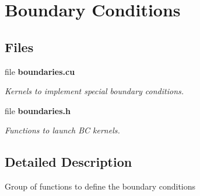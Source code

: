 \section{Boundary Conditions}
\label{group__boundaries}
\subsection*{Files}
\begin{DoxyCompactItemize}
\item 
file {\bf boundaries.\-cu}
\begin{DoxyCompactList}\small\item\em Kernels to implement special boundary conditions. \end{DoxyCompactList}\item 
file {\bf boundaries.\-h}
\begin{DoxyCompactList}\small\item\em Functions to launch B\-C kernels. \end{DoxyCompactList}\end{DoxyCompactItemize}


\subsection{Detailed Description}
Group of functions to define the boundary conditions 